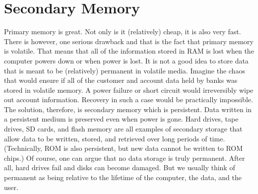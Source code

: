 \section{Secondary Memory}
Primary memory is great. Not only is it (relatively) cheap, it is also very fast. There is however, one serious drawback and that is the fact that primary memory is volatile. That means that all of the information stored in RAM is lost when the computer powers down or when power is lost.
It is not a good idea to store data that is meant to be (relatively) permanent in volatile media. Imagine the chaos that would ensure if all of the customer and account data held by banks was stored in volatile memory. A power failure or short circuit would irreversibly wipe out account information. Recovery in such a case would be practically impossible.
The solution, therefore, is secondary memory which is persistent. Data written in a persistent medium is preserved even when power is gone. Hard drives, tape drives, SD cards, and flash memory are all examples of secondary storage that allow data to be written, stored, and retrieved over long periods of time. (Technically, ROM is also persistent, but new data cannot be written to ROM chips.) Of course, one can argue that no data storage is truly permanent. After all, hard drives fail and disks can become damaged. But we usually think of permanent as being relative to the lifetime of the computer, the data, and the user.


